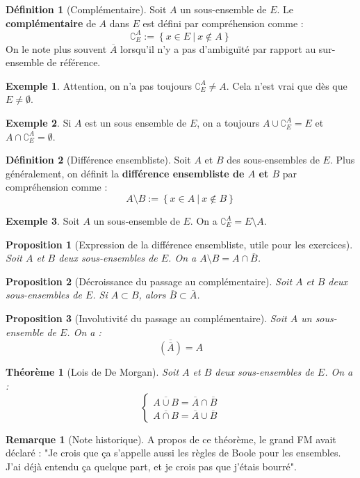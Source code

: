 \documentclass[french]{book}
\theoremstyle{plain}
\newtheorem{thm}{Théorème}[chapter]
\newtheorem{prop}{Proposition}[chapter]
\theoremstyle{definition}
\newtheorem{dfn}{Définition}[chapter]
\newtheorem{exa}{Exemple}[chapter]
\newtheorem{rmq}{Remarque}[chapter]
\theoremstyle{remark}
\begin{document}
\begin{dfn}[Complémentaire]
	Soit $A$ un sous-ensemble de $E$. Le \textbf{complémentaire} de $A$ dans $E$ est défini par compréhension comme : $$\complement_E^A:=\left\{x\in E\ | \ x\notin A\right\}$$ On le note plus souvent $\overline{A}$ lorsqu'il n'y a pas d'ambiguïté par rapport au sur-ensemble de référence.
\end{dfn}
\begin{exa}
	Attention, on n'a pas toujours $\complement_E^A\ne A$. Cela n'est vrai que dès que $E\ne\emptyset$.
\end{exa}
\begin{exa}
	Si $A$ est un sous ensemble de $E$, on a toujours $A\cup\complement_E^A=E$ et $A\cap\complement_E^A=\emptyset$.
\end{exa}
\begin{dfn}[Différence ensembliste]
	Soit $A$ et $B$ des sous-ensembles de $E$. Plus généralement, on définit la \textbf{différence ensembliste de $A$ et $B$} par compréhension comme : $$A\setminus B:=\left\{x\in A\ | \ x\notin B\right\}$$
\end{dfn}
\begin{exa}
	Soit $A$ un sous-ensemble de $E$. On a $\complement_E^A=E\setminus A$.
\end{exa}
\begin{prop}[Expression de la différence ensembliste, utile pour les exercices]
	Soit $A$ et $B$ deux sous-ensembles de $E$. On a $A\setminus B=A\cap \overline{B}$.
\end{prop}
\begin{prop}[Décroissance du passage au complémentaire]
	Soit $A$ et $B$ deux sous-ensembles de $E$. Si $A\subset B$, alors $\overline{B}\subset\overline{A}$.
\end{prop}
\begin{prop}[Involutivité du passage au complémentaire]
	Soit $A$ un sous-ensemble de $E$. On a : $$\overline{(\overline{A})}=A$$
\end{prop}
\begin{thm}[Lois de De Morgan]
	Soit $A$ et $B$ deux sous-ensembles de $E$. On a : $$\begin{cases}
		\overline{A\cup B}=\overline{A}\cap\overline{B} \\ \overline{A\cap B}=\overline{A}\cup\overline{B}
	\end{cases}$$
\end{thm}
\begin{rmq}[Note historique]
	A propos de ce théorème, le grand FM avait déclaré : "Je crois que ça s'appelle aussi les règles de Boole pour les ensembles. J'ai déjà entendu ça quelque part, et je crois pas que j'étais bourré".
\end{rmq}
\end{document}
